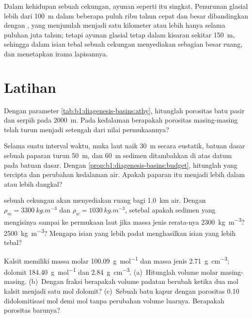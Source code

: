 Dalam kehidupan sebuah cekungan, ayunan seperti itu singkat. Penurunan glasial lebih dari \qty{100}{m} dalam beberapa puluh ribu tahun cepat dan besar dibandingkan dengan , yang menjumlah menjadi satu kilometer atau lebih hanya selama puluhan juta tahun; tetapi ayunan glasial tetap dalam kisaran sekitar \qty{150}{m}, sehingga dalam isian tebal sebuah cekungan  menyediakan sebagian besar ruang, dan  menetapkan irama lapisannya.

\section{Latihan}

\begin{exercise}[$\star$]\label{exo:b1:diagenesis-basins:1}
Dengan parameter \cref{tab:b1:diagenesis-basins:athy}, hitunglah porositas batu pasir dan serpih pada \qty{2000}{m}. Pada kedalaman berapakah porositas masing-masing telah turun menjadi setengah dari nilai permukaannya?
\end{exercise}

\begin{exercise}[$\star$]\label{exo:b1:diagenesis-basins:2}
Selama suatu interval waktu, muka laut naik \qty{30}{m} secara eustatik, batuan dasar sebuah paparan turun \qty{50}{m}, dan \qty{60}{m} sedimen ditambahkan di atas datum pada batuan dasar. Dengan \cref{prop:b1:diagenesis-basins:budget}, hitunglah  yang tercipta dan perubahan kedalaman air. Apakah paparan itu menjadi lebih dalam atau lebih dangkal?
\end{exercise}

\begin{exercise}[$\star$]\label{exo:b1:diagenesis-basins:3}
 sebuah cekungan akan menyediakan ruang bagi \qty{1.0}{km} air. Dengan $\rho_m = \qty{3300}{kg.m^{-3}}$ dan $\rho_w = \qty{1030}{kg.m^{-3}}$, setebal apakah sedimen yang mengisinya sampai ke permukaan laut jika massa jenis rerata-nya \qty{2300}{kg.m^{-3}}? \qty{2500}{kg.m^{-3}}? Mengapa isian yang lebih padat menghasilkan isian yang lebih tebal?
\end{exercise}

\begin{exercise}[$\star$]\label{exo:b1:diagenesis-basins:4}
Kalsit memiliki massa molar \qty{100.09}{g.mol^{-1}} dan massa jenis \qty{2.71}{g.cm^{-3}}; dolomit \qty{184.40}{g.mol^{-1}} dan \qty{2.84}{g.cm^{-3}}. (a)~Hitunglah volume molar masing-masing. (b)~Dengan fraksi berapakah volume padatan berubah ketika dua mol kalsit menjadi satu mol dolomit? (c)~Sebuah batu kapur dengan porositas \num{0.10} didolomitisasi mol demi mol tanpa perubahan volume luarnya. Berapakah porositas barunya?
\end{exercise}

